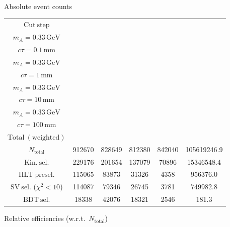 \documentclass[10pt,a4paper]{article}
\renewcommand{\arraystretch}{1.4}
\begin{document}
{\footnotesize\setlength{\tabcolsep}{4pt}\renewcommand{\arraystretch}{1.05}%
\vspace{12pt}

Absolute event counts

\begin{tabular}{cccccc}
\toprule
$\mathrm{Cut\ step}$ & \shortstack{$m_{\pi}=1\,\mathrm{GeV}$\\$m_{A}=0.33\,\mathrm{GeV}$\\$c\tau=0.1\,\mathrm{mm}$} & \shortstack{$m_{\pi}=1\,\mathrm{GeV}$\\$m_{A}=0.33\,\mathrm{GeV}$\\$c\tau=1\,\mathrm{mm}$} & \shortstack{$m_{\pi}=1\,\mathrm{GeV}$\\$m_{A}=0.33\,\mathrm{GeV}$\\$c\tau=10\,\mathrm{mm}$} & \shortstack{$m_{\pi}=1\,\mathrm{GeV}$\\$m_{A}=0.33\,\mathrm{GeV}$\\$c\tau=100\,\mathrm{mm}$} & \shortstack{$\mathrm{QCD}$\\$\mathrm{Total\ (weighted)}$} \\
\midrule
$N_{\mathrm{total}}$ & 912670 & 828649 & 812380 & 842040 & 105619246.9\\
$\mathrm{Kin.\ sel.}$ & 229176 & 201654 & 137079 & 70896 & 15346548.4\\
$\mathrm{HLT\ presel.}$ & 115065 & 83873 & 31326 & 4358 & 956376.0\\
$\mathrm{SV\ sel.}$ ($\chi^2{<}10$) & 114087 & 79346 & 26745 & 3781 & 749982.8\\
$\mathrm{BDT\ sel.}$ & 18338 & 42076 & 18321 & 2546 & 181.3\\
\bottomrule
\end{tabular}

\vspace{18pt}

Relative efficiencies (w.r.t.\ $N_{\mathrm{total}}$)

}
\end{document}
